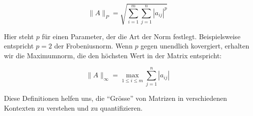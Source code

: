 \begin{equation}
    \| A \|_P = \sqrt{\sum_{i=1}^{m} \sum_{j=1}^{n} |a_{ij}|^p}
    \label{eq:Matrixnorm}
\end{equation}

Hier steht $p$ für einen Parameter, der die Art der Norm festlegt. Beispielsweise entspricht $p=2$ der Frobeniusnorm. Wenn $p$ gegen unendlich kovergiert, erhalten wir die Maximumnorm, die den höchsten Wert in der Matrix entspricht:

\begin{equation}
    \|A\|_{\infty} = \max_{1 \leq i \leq m} \sum_{j=1}^{n} |a_{ij}|
    \label{eq:Maximumnorm}
\end{equation}

Diese Definitionen helfen uns, die "`Grösse"' von Matrizen in verschiedenen Kontexten zu verstehen und zu quantifizieren.